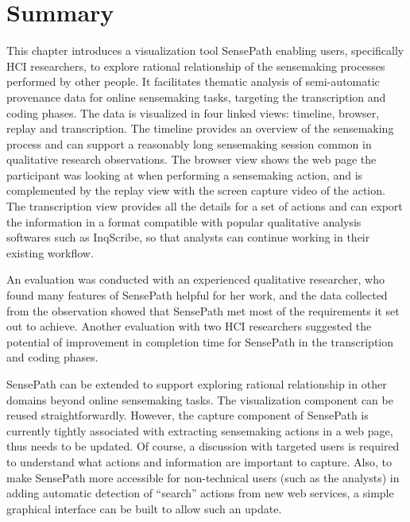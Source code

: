 \section{Summary}
This chapter introduces a visualization tool SensePath enabling users, specifically HCI researchers, to explore rational relationship of the sensemaking processes performed by other people. It facilitates thematic analysis of semi-automatic provenance data for online sensemaking tasks, targeting the transcription and coding phases. The data is visualized in four linked views: timeline, browser, replay and transcription. The timeline provides an overview of the sensemaking process and can support a reasonably long sensemaking session common in qualitative research observations. The browser view shows the web page the participant was looking at when performing a sensemaking action, and is complemented by the replay view with the screen capture video of the action. The transcription view provides all the details for a set of actions and can export the information in a format compatible with popular qualitative analysis softwares such as InqScribe, so that analysts can continue working in their existing workflow. 

An evaluation was conducted with an experienced qualitative researcher, who found many features of SensePath helpful for her work, and the data collected from the observation showed that SensePath met most of the requirements it set out to achieve. Another evaluation with two HCI researchers suggested the potential of improvement in completion time for SensePath in the transcription and coding phases.

SensePath can be extended to support exploring rational relationship in other domains beyond online sensemaking tasks. The visualization component can be reused straightforwardly. However, the capture component of SensePath is currently tightly associated with extracting sensemaking actions in a web page, thus needs to be updated. Of course, a discussion with targeted users is required to understand what actions and information are important to capture.  Also, to make SensePath more accessible for non-technical users (such as the analysts) in adding automatic detection of ``search'' actions from new web services, a simple graphical interface can be built to allow such an update.
